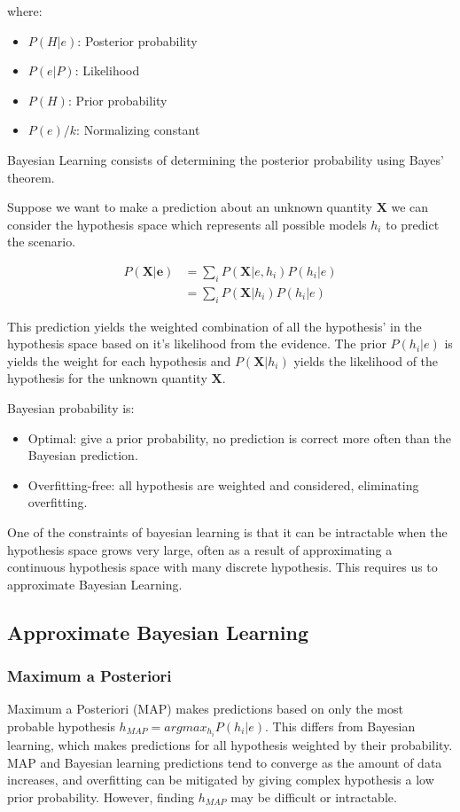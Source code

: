 \documentclass[12pt]{article}
\begin{document}
    where:
    \begin{itemize}
        \item $P(H|e)$: Posterior probability
        \item $P(e|P)$: Likelihood
        \item $P(H)$: Prior probability
        \item $P(e)/k$: Normalizing constant
    \end{itemize}

    Bayesian Learning consists of determining the posterior probability using Bayes' theorem.
    
    Suppose we want to make a prediction about an unknown quantity $\boldsymbol{X}$ we can consider the hypothesis space which represents all possible models $h_i$ to predict the scenario.

    \begin{align}
        P(\boldsymbol{X}|\boldsymbol{e}) &= \sum_i P(\boldsymbol{X}|e, h_i)P(h_i|e) \\
        &= \sum_i P(\boldsymbol{X}|h_i)P(h_i|e)
    \end{align}

    This prediction yields the weighted combination of all the hypothesis' in the hypothesis space based on it's likelihood from the evidence. The prior $P(h_i | e)$ is yields the weight for each hypothesis and $P(\boldsymbol{X}|h_i)$ yields the likelihood
    of the hypothesis for the unknown quantity $\boldsymbol{X}$.

    Bayesian probability is:
    \begin{itemize}
        \item Optimal: give a prior probability, no prediction is correct more often than the Bayesian prediction.
        \item Overfitting-free: all hypothesis are weighted and considered, eliminating overfitting.
    \end{itemize}

    One of the constraints of bayesian learning is that it can be intractable when the hypothesis space grows very large, often as a result of approximating a continuous hypothesis space with many discrete hypothesis. This requires us to approximate 
    Bayesian Learning.

    \subsection{Approximate Bayesian Learning}
    \subsubsection{Maximum a Posteriori}
        Maximum a Posteriori (MAP) makes predictions based on only the most probable hypothesis $h_{MAP} = argmax_{h_i}P(h_i | e)$. This differs from Bayesian learning, which makes predictions for all hypothesis weighted by their probability. 
        MAP and Bayesian learning predictions tend to converge as the amount of data increases, and overfitting can be mitigated by giving complex hypothesis a low prior probability. However, finding $h_{MAP}$ may be difficult or intractable.
\end{document}
